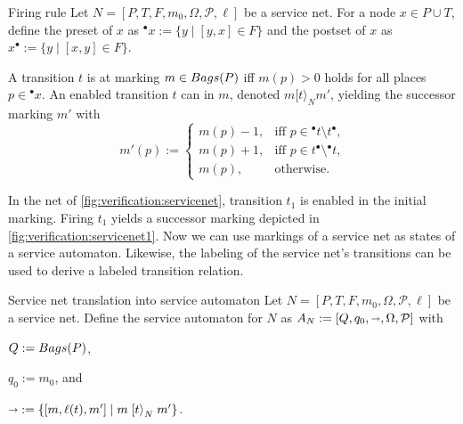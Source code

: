\begin{definition}{Firing rule}
\nomenclature[mtm]{$m \mathrel{[t\rangle}_N m'$}{firing transition $t$ in marking $m$ resulting marking $m'$}%
Let $N=[P,T,F,m_0,\Omega,\mathcal{P},\ell]$ be a service net. For a node $x\in P\cup T$, define the preset of $x$ as ${}^\bullet x:=\{y\mid [y,x]\in F\}$ and the postset of $x$ as $x^\bullet:=\{y\mid [x,y]\in F\}$.

A transition $t$ is  at marking $m\in\mathop{Bags}(P)$ iff $m(p)>0$ holds for all places $p \in {}^\bullet x$. An enabled transition $t$ can  in $m$, denoted $m \mathrel{[t\rangle}_N m'$, yielding the successor marking $m'$ with\vspace{-0.5em}
$$m'(p):=\begin{cases}
m(p)-1,&\text{iff $p\in {}^\bullet t \setminus t^\bullet$,}\\
m(p)+1,&\text{iff $p\in t^\bullet \setminus {}^\bullet t$,}\\
m(p),&\text{otherwise.}\end{cases}$$\vspace{-1em}
\end{definition}

In the net of \autoref{fig:verification:servicenet}, transition $t_{1}$ is enabled in the initial marking. Firing $t_{1}$ yields a successor marking depicted in \autoref{fig:verification:servicenet1}. Now we can use markings of a service net as states of a service automaton. Likewise, the labeling of the service net's transitions can be used to derive a labeled transition relation.

\begin{definition}{Service net translation into service automaton}
%
Let $N=[P,T,F,m_0,\Omega,\mathcal{P},\ell]$ be a service net. Define the service automaton for $N$ as $A_N:=[Q,q_0,{\shortrightarrow},\Omega,\mathcal{P}]$ with
\begin{myitemize}
\item $Q:=\mathop{Bags}(P)$,
\item $q_0 := m_0$, and
\item ${\shortrightarrow} := \{ [m,\ell(t),m'] \mid m \mathrel{[t\rangle}_N m' \}$.
\end{myitemize}
\end{definition}


